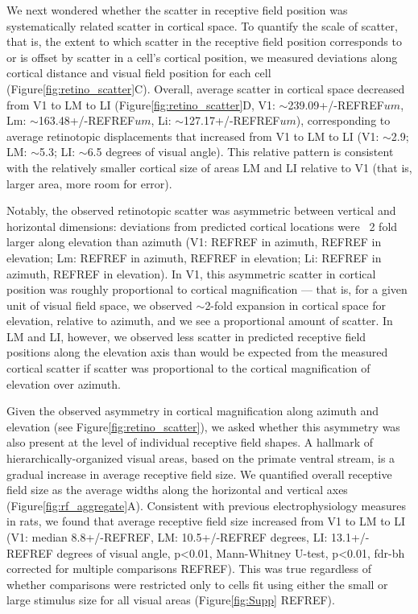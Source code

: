 We next wondered whether the scatter in receptive field position was systematically related scatter in cortical space. To quantify the scale of scatter, that is, the extent to which scatter in the receptive field position corresponds to or is offset by scatter in a cell's cortical position, we measured deviations along cortical distance and visual field position for each cell (Figure\ref{fig:retino_scatter}C). Overall, average scatter in cortical space decreased from V1 to LM to LI (Figure\ref{fig:retino_scatter}D, V1: $\sim$239.09+/-REFREF$um$, Lm: $\sim$163.48+/-REFREF$um$, Li: $\sim$127.17+/-REFREF$um$), corresponding to average retinotopic displacements that increased from V1 to LM to LI (V1: $\sim$2.9; LM: $\sim$5.3; LI: $\sim$6.5 degrees of visual angle). This relative pattern is consistent with the relatively smaller cortical size of areas LM and LI relative to V1 (that is, larger area, more room for error).  

Notably, the observed retinotopic scatter was asymmetric between vertical and horizontal dimensions:  deviations from predicted cortical locations were ~2 fold larger along elevation than azimuth (V1: REFREF in azimuth, REFREF in elevation; Lm: REFREF in azimuth, REFREF in elevation; Li: REFREF in azimuth, REFREF in elevation). In V1, this asymmetric scatter in cortical position was roughly proportional to cortical magnification --- that is, for a given unit of visual field space, we observed $\sim$2-fold expansion in cortical space  for elevation, relative to azimuth, and we see a proportional amount of scatter. In LM and LI, however, we observed less scatter in predicted receptive field positions along the elevation axis than would be expected from the measured cortical scatter if scatter was proportional to the cortical magnification of elevation over azimuth.


Given the observed asymmetry in cortical magnification along azimuth and elevation (see Figure\ref{fig:retino_scatter}), we asked whether this asymmetry was also present at the level of individual receptive field shapes. A hallmark of hierarchically-organized visual areas, based on the primate ventral stream, is a gradual increase in average receptive field size\cite{RustREFREF, Vermaerke2014, Siegle2019AAreas, Tafazoli2017}. We quantified overall receptive field size as the average widths along the horizontal and vertical axes (Figure\ref{fig:rf_aggregate}A). Consistent with previous electrophysiology measures in rats\cite{Vermaercke2014, Tafazoli2017}, we found that average receptive field size increased from V1 to LM to LI (V1: median 8.8+/-REFREF, LM: 10.5+/-REFREF degrees, LI: 13.1+/-REFREF degrees of visual angle, p<0.01, Mann-Whitney U-test, p<0.01, fdr-bh corrected for multiple comparisons REFREF). This was true regardless of whether comparisons were restricted only to cells fit using either the small or large stimulus size for all visual areas (Figure\ref{fig:Supp} REFREF).  

